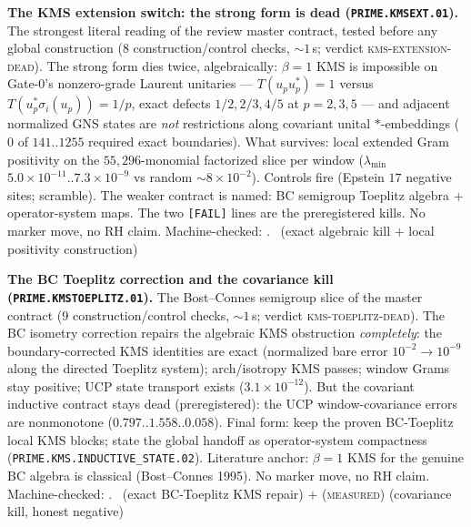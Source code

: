 \par\smallskip\noindent\textbf{The KMS extension switch: the strong
form is dead (\texttt{PRIME.KMSEXT.01}).}
The strongest literal reading of the review master contract, tested
before any global construction ($8$ construction/control checks,
${\sim}1$\,s; verdict \textsc{kms-extension-dead}).  The strong form
dies twice, algebraically: $\beta=1$ KMS is impossible on Gate-0's
nonzero-grade Laurent unitaries --- $T(u_pu_p^*)=1$ versus
$T(u_p^*\sigma_i(u_p))=1/p$, exact defects $1/2,2/3,4/5$ at
$p=2,3,5$ --- and adjacent normalized GNS states are \emph{not}
restrictions along covariant unital $*$-embeddings ($0$ of
$141..1255$ required exact boundaries).  What survives: local
extended Gram positivity on the $55{,}296$-monomial factorized
slice per window ($\lambda_{\min}$
$5.0\times10^{-11}..7.3\times10^{-9}$ vs random ${\sim}8\times
10^{-2}$).  Controls fire (Epstein $17$ negative sites; scramble).
The weaker contract is named: BC semigroup Toeplitz algebra $+$
operator-system maps.  The two \texttt{[FAIL]} lines are the
preregistered kills.  No marker move, no RH claim.
Machine-checked: .
\mE\ (exact algebraic kill $+$ local positivity construction)
\par\smallskip


\par\smallskip\noindent\textbf{The BC Toeplitz correction and the
covariance kill (\texttt{PRIME.KMSTOEPLITZ.01}).}
The Bost--Connes semigroup slice of the master contract ($9$
construction/control checks, ${\sim}1$\,s; verdict
\textsc{kms-toeplitz-dead}).  The BC isometry correction repairs
the algebraic KMS obstruction \emph{completely}: the
boundary-corrected KMS identities are exact (normalized bare error
$10^{-2}\to10^{-9}$ along the directed Toeplitz system);
arch/isotropy KMS passes; window Grams stay positive; UCP state
transport exists ($3.1\times10^{-12}$).  But the covariant
inductive contract stays dead (preregistered): the UCP
window-covariance errors are nonmonotone ($0.797..1.558..0.058$).
Final form: keep the proven BC-Toeplitz local KMS blocks; state the
global handoff as operator-system compactness
(\texttt{PRIME.KMS.INDUCTIVE\_STATE.02}).  Literature anchor:
$\beta=1$ KMS for the genuine BC algebra is classical
(Bost--Connes 1995).  No marker move, no RH claim.
Machine-checked: .
\mE\ (exact BC-Toeplitz KMS repair) $+$ (\textsc{measured})
(covariance kill, honest negative)
\par\smallskip


